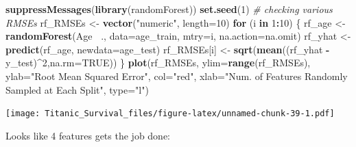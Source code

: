 \documentclass[]{article}
\newenvironment{Shaded}{\begin{snugshade}}{\end{snugshade}}
\newcommand{\KeywordTok}[1]{\textcolor[rgb]{0.13,0.29,0.53}{\textbf{#1}}}
\newcommand{\DataTypeTok}[1]{\textcolor[rgb]{0.13,0.29,0.53}{#1}}
\newcommand{\DecValTok}[1]{\textcolor[rgb]{0.00,0.00,0.81}{#1}}
\newcommand{\StringTok}[1]{\textcolor[rgb]{0.31,0.60,0.02}{#1}}
\newcommand{\CommentTok}[1]{\textcolor[rgb]{0.56,0.35,0.01}{\textit{#1}}}
\newcommand{\OtherTok}[1]{\textcolor[rgb]{0.56,0.35,0.01}{#1}}
\newcommand{\ControlFlowTok}[1]{\textcolor[rgb]{0.13,0.29,0.53}{\textbf{#1}}}
\newcommand{\OperatorTok}[1]{\textcolor[rgb]{0.81,0.36,0.00}{\textbf{#1}}}
\newcommand{\NormalTok}[1]{#1}
\begin{document}
\begin{Shaded}
\begin{Highlighting}[]
\KeywordTok{suppressMessages}\NormalTok{(}\KeywordTok{library}\NormalTok{(randomForest))}
\KeywordTok{set.seed}\NormalTok{(}\DecValTok{1}\NormalTok{)}
\CommentTok{# checking various RMSEs}
\NormalTok{rf_RMSEs <-}\StringTok{ }\KeywordTok{vector}\NormalTok{(}\StringTok{"numeric"}\NormalTok{, }\DataTypeTok{length=}\DecValTok{10}\NormalTok{)}
\ControlFlowTok{for}\NormalTok{ (i }\ControlFlowTok{in} \DecValTok{1}\OperatorTok{:}\DecValTok{10}\NormalTok{) \{}
\NormalTok{  rf_age <-}\StringTok{ }\KeywordTok{randomForest}\NormalTok{(Age }\OperatorTok{~}\NormalTok{., }\DataTypeTok{data=}\NormalTok{age_train, }\DataTypeTok{mtry=}\NormalTok{i, }\DataTypeTok{na.action=}\NormalTok{na.omit)}
\NormalTok{  rf_yhat <-}\StringTok{ }\KeywordTok{predict}\NormalTok{(rf_age, }\DataTypeTok{newdata=}\NormalTok{age_test)}
\NormalTok{  rf_RMSEs[i] <-}\StringTok{ }\KeywordTok{sqrt}\NormalTok{(}\KeywordTok{mean}\NormalTok{((rf_yhat }\OperatorTok{-}\StringTok{ }\NormalTok{y_test)}\OperatorTok{^}\DecValTok{2}\NormalTok{,}\DataTypeTok{na.rm=}\OtherTok{TRUE}\NormalTok{))}
\NormalTok{\}}
\KeywordTok{plot}\NormalTok{(rf_RMSEs, }\DataTypeTok{ylim=}\KeywordTok{range}\NormalTok{(rf_RMSEs), }\DataTypeTok{ylab=}\StringTok{"Root Mean Squared Error"}\NormalTok{, }\DataTypeTok{col=}\StringTok{"red"}\NormalTok{,}
     \DataTypeTok{xlab=}\StringTok{"Num. of Features Randomly Sampled at Each Split"}\NormalTok{, }\DataTypeTok{type=}\StringTok{"l"}\NormalTok{)}
\end{Highlighting}
\end{Shaded}

\texttt{[image: Titanic\_Survival\_files/figure-latex/unnamed-chunk-39-1.pdf]}

Looks like 4 features gets the job done:
\end{document}
